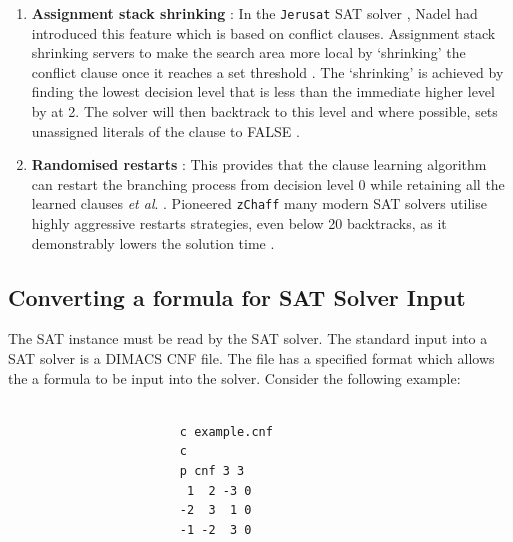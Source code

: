 \documentclass[11pt, a4paper, oneside]{report} %
\begin{document}
\begin{enumerate}
  \item \textbf{Assignment stack shrinking} : In the \texttt{Jerusat} SAT solver
\cite{nadel2002jerusat}, Nadel had introduced this feature which is based on
conflict clauses. Assignment stack shrinking servers to make the search area
more local by `shrinking' the conflict clause once it reaches a set threshold
\cite{Nadel:2010:ASS:2164073.2164111}. The `shrinking' is achieved by finding
the lowest decision level that is less than the immediate higher level by at 2.
The solver will then backtrack to this level and where possible, sets unassigned
literals of the clause to FALSE \cite{Nadel:2010:ASS:2164073.2164111}.

  \item \textbf{Randomised restarts} : This provides that the clause learning
algorithm can restart the branching process from decision level 0 while
retaining all the learned clauses \textit{et   al}. \cite{gomes1998boosting}.
Pioneered \texttt{zChaff} \cite{moskewicz2001chaff} many modern   SAT solvers
utilise highly aggressive restarts strategies, even below 20 backtracks, as it
demonstrably lowers the solution time \cite{gomes2008satisfiability}.

\end{enumerate}


\subsection{Converting a formula for SAT Solver Input}

The SAT instance must be read by the SAT solver. The standard input into a SAT
solver is a DIMACS CNF file\cite{DimacsSatFormat}. The file has a specified
format which allows the a formula to be input into the solver. Consider the
following example:



                      \begin{lstlisting}

                        c example.cnf
                        c
                        p cnf 3 3
                         1  2 -3 0
                        -2  3  1 0
                        -1 -2  3 0
                      \end{lstlisting}
\end{document}
